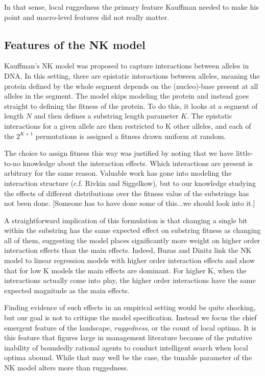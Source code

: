 \documentclass[12pt]{article}
\begin{document}
In that sense, local ruggedness the primary feature Kauffman needed to make his point and macro-level features did not really matter. 





\subsection*{Features of the NK model}



Kauffman's NK model was proposed to capture interactions between alleles in DNA. In this setting, there are epistatic interactions between alleles, meaning the protein defined by the whole segment depends on the (nucleo)-base present at all alleles in the segment. The model skips modeling the protein and instead goes straight to defining the fitness of the protein. To do this, it looks at a segment of length $N$ and then defines a substring length parameter $K$. The epistatic interactions for a given allele are then restricted to K other alleles, and each of the $2^{K+1}$ permutations is assigned a fitness drawn uniform at random.

The choice to assign fitness this way was justified by noting that we have little-to-no knowledge about the interaction effects. Which interactions are present is arbitrary for the same reason. Valuable work has gone into modeling the interaction structure (c.f. Rivkin and Siggelkow), but to our knowledge studying the effects of different distributions over the fitness value of the substrings has not been done. [Someone has to have done some of this...we should look into it.]

A straightforward implication of this formulation is that changing a single bit within the substring has the same expected effect on substring fitness as changing all of them, suggesting the model places significantly more weight on higher order interaction effects than the main effects. Indeed, Buzas and Dinitz link the NK model to linear regression models with higher order interaction effects and show that for low K models the main effects are dominant. For higher K, when the interactions actually come into play, the higher order interactions have the same expected magnitude as the main effects.

Finding evidence of such effects in an empirical setting would be quite shocking, but our goal is not to critique the model specification. Instead we focus the chief emergent feature of the landscape, \textit{ruggedness}, or the count of local optima. It is this feature that figures large in management literature because of the putative inability of boundedly rational agents to conduct intelligent search when local optima abound. While that may well be the case, the tunable parameter of the NK model alters more than ruggedness.
\end{document}
